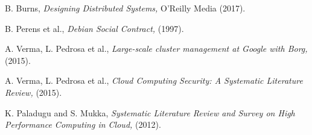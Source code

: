 \documentclass[11pt,twoside]{article}
\begin{document}
\begin{thebibliography}{99}

 B. Burns, {\it Designing Distributed Systems,} O'Reilly Media (2017).

 B. Perens et al., {\it Debian Social Contract,} (1997).

 A. Verma, L. Pedrosa  et al., {\it Large-scale cluster management at Google with Borg,} (2015).

 A. Verma, L. Pedrosa  et al., {\it Cloud Computing Security: A Systematic Literature Review,} (2015).

 K. Paladugu and S. Mukka, {\it Systematic Literature Review and Survey on High Performance Computing in Cloud,} (2012).

\end{thebibliography}
\end{document}
